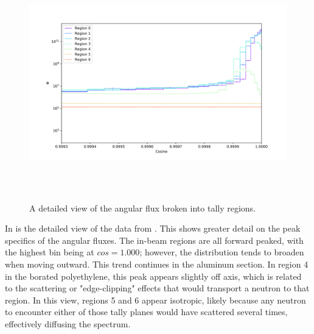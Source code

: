 \begin{figure}[htb]
\centering
\includegraphics[height=4in]{tex/figures/flux_rad_cos_detail.png}
\caption[Detailed Regional Flux vs. Angle]{A detailed view of the angular flux broken into tally regions.}
\label{fig:flux_rad_cos_detail}
\end{figure}

In  is the detailed view of the data from .
This shows greater detail on the peak specifics of the angular fluxes.
The in-beam regions are all forward peaked, with the highest bin being at $cos=1.000$; however, the distribution tends to broaden when moving outward.
This trend continues in the aluminum section.
In region 4 in the borated polyethylene, this peak appears slightly off axis, which is related to the scattering or "edge-clipping" effects that would transport a neutron to that region.
In this view, regions 5 and 6 appear isotropic, likely because any neutron to encounter either of those tally planes would have scattered several times, effectively diffusing the spectrum.

